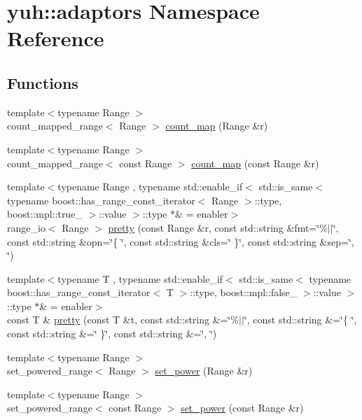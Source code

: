 \hypertarget{namespaceyuh_1_1adaptors}{\section{yuh\-:\-:adaptors \-Namespace \-Reference}
\label{de/d55/namespaceyuh_1_1adaptors}
}
\subsection*{\-Functions}
\begin{DoxyCompactItemize}
\item 
{\footnotesize template$<$typename Range $>$ }\\count\-\_\-mapped\-\_\-range$<$ \-Range $>$ \hyperlink{namespaceyuh_1_1adaptors_acb67fe5826a7f7b7ac61edf1dfcff82f}{count\-\_\-map} (\-Range \&r)
\item 
{\footnotesize template$<$typename Range $>$ }\\count\-\_\-mapped\-\_\-range$<$ const \-Range $>$ \hyperlink{namespaceyuh_1_1adaptors_a6b46059339338da677245db0a97006c6}{count\-\_\-map} (const \-Range \&r)
\item 
{\footnotesize template$<$typename Range , typename std\-::enable\-\_\-if$<$ std\-::is\-\_\-same$<$ typename boost\-::has\-\_\-range\-\_\-const\-\_\-iterator$<$ Range $>$\-::type, boost\-::mpl\-::true\-\_\- $>$\-::value $>$\-::type $\ast$\&  = enabler$>$ }\\range\-\_\-io$<$ \-Range $>$ \hyperlink{namespaceyuh_1_1adaptors_a1144c5d97c9a22ad2974a9b92d72a83a}{pretty} (const \-Range \&r, const std\-::string \&fmt=\char`\"{}\%$|$$|$\char`\"{}, const std\-::string \&opn=\char`\"{}\{ \char`\"{}, const std\-::string \&cls=\char`\"{} \}\char`\"{}, const std\-::string \&sep=\char`\"{}, \char`\"{})
\item 
{\footnotesize template$<$typename T , typename std\-::enable\-\_\-if$<$ std\-::is\-\_\-same$<$ typename boost\-::has\-\_\-range\-\_\-const\-\_\-iterator$<$ T $>$\-::type, boost\-::mpl\-::false\-\_\- $>$\-::value $>$\-::type $\ast$\&  = enabler$>$ }\\const \-T \& \hyperlink{namespaceyuh_1_1adaptors_aae2589510dae0b03d7cf37a7a85eec69}{pretty} (const \-T \&t, const std\-::string \&=\char`\"{}\%$|$$|$\char`\"{}, const std\-::string \&=\char`\"{}\{ \char`\"{}, const std\-::string \&=\char`\"{} \}\char`\"{}, const std\-::string \&=\char`\"{}, \char`\"{})
\item 
{\footnotesize template$<$typename Range $>$ }\\set\-\_\-powered\-\_\-range$<$ \-Range $>$ \hyperlink{namespaceyuh_1_1adaptors_af3fcfee5424bbff193826b77df52f6e5}{set\-\_\-power} (\-Range \&r)
\item 
{\footnotesize template$<$typename Range $>$ }\\set\-\_\-powered\-\_\-range$<$ const \-Range $>$ \hyperlink{namespaceyuh_1_1adaptors_a1234598f449f8f846dd3f26fe83f6682}{set\-\_\-power} (const \-Range \&r)
\end{DoxyCompactItemize}


